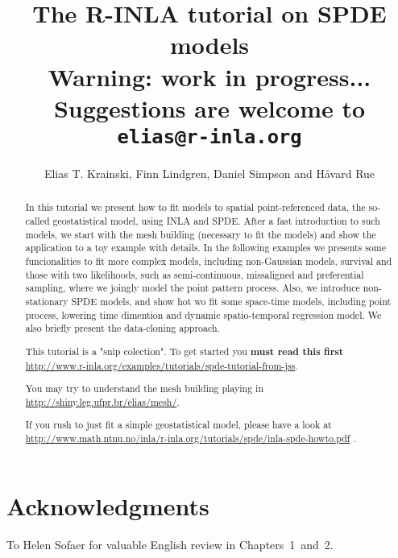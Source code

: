 \documentclass[a4paper,11pt]{report}
\title{\textbf{The R-INLA tutorial on SPDE models}\\
Warning: work in progress...\\
Suggestions are welcome to \texttt{elias@r-inla.org}}
\author{Elias T. Krainski, Finn Lindgren, Daniel Simpson and H{\aa}vard Rue}
\begin{document}
\maketitle

\begin{abstract}
  In this tutorial we present how to fit models 
  to spatial point-referenced data, the so-called 
  geostatistical model, using INLA and SPDE. 
  After a fast introduction to such models, 
  we start with the mesh building 
  (necessary to fit the models) and show the application 
  to a toy example with details. 
  In the following examples we presents some funcionalities 
  to fit more complex models, including non-Gaussian models, 
  survival and those with two likelihoods, such as semi-continuous,  
  missaligned and preferential sampling, where we joingly model 
  the point pattern process. Also, we introduce 
  non-stationary SPDE models, and show hot wo fit 
  some space-time models, including point process, 
  lowering time dimention and dynamic spatio-temporal regression model. 
  We also briefly present the data-cloning approach.

This tutorial is a "snip colection". 
To get started you \textbf{must read this first} 
\url{http://www.r-inla.org/examples/tutorials/spde-tutorial-from-jss}.

You may try to understand the mesh building playing in 
\url{http://shiny.leg.ufpr.br/elias/mesh/}. 

If you rush to just fit a simple geostatistical model, 
please have a look at 
\url{http://www.math.ntnu.no/inla/r-inla.org/tutorials/spde/inla-spde-howto.pdf}
.

\end{abstract}

\section{Acknowledgments}
To Helen Sofaer for valuable English review in 
Chapters~1~and~2. 

 

\tableofcontents

 

 
 

 
 
 
 



 



 



\end{document}
